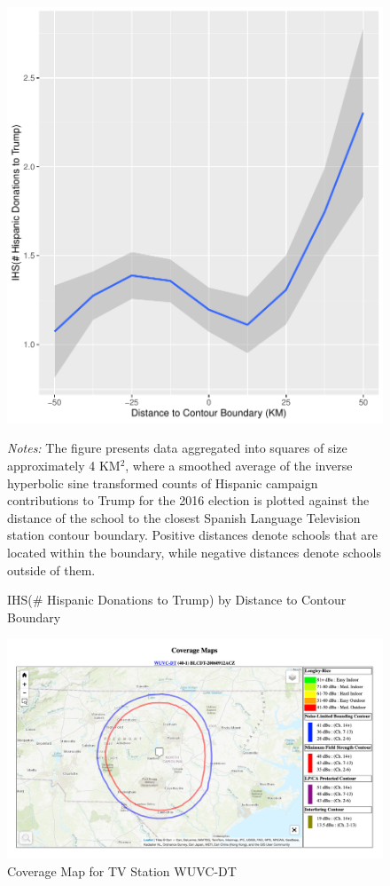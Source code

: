 \documentclass[11pt]{article}
\begin{document}
\begin{figure}[!hbtp]
\centering
\caption{IHS(\# Hispanic Donations to Trump) by Distance to Contour Boundary }\label{donationsfig}
\includegraphics[width=12cm]{../../analysis/Output/graphs/hispanictrump.pdf}

\textit{Notes:} The figure presents data aggregated into squares of size approximately 4 KM$^2$, where a smoothed average of the inverse hyperbolic sine transformed counts of Hispanic campaign contributions to Trump for the 2016 election is plotted against the distance of the school to the closest Spanish Language Television station contour boundary. Positive distances denote schools that are located within the boundary, while negative distances denote schools outside of them.
\end{figure} 

\begin{figure}[!hbtp]
\centering
\caption{Coverage Map for TV Station WUVC-DT}\label{contourexamplefig}
\includegraphics[width=15cm]{../../analysis/Output/img/ContourExample.png}
\end{figure} 
\end{document}
